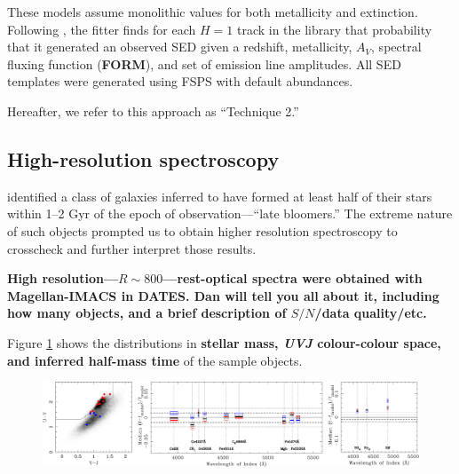 \documentclass[a4paper,fleqn,usenatbib]{mnras}
\newcommand{\bfr}{\bf\color{red}}
\newcommand{\tobs}{t_{\rm obs}}
\begin{document}
These models assume monolithic values for both metallicity and extinction. Following 
\citealt{Pacifici12}, the fitter finds for each $H=1$ track in the library that probability that it generated
an observed SED given a redshift, metallicity, $A_{V}$, spectral fluxing function ({\bfr FORM}), and 
set of emission line amplitudes. All SED templates were generated using FSPS with default abundances.

Hereafter, we refer to this approach as ``Technique 2.''

\subsection{High-resolution spectroscopy}
\label{sec: hiRes}

\citet{Dressler16, Dressler18} identified a class of galaxies inferred to have formed at least half of 
their stars within 1--2 Gyr of the epoch of observation---``late bloomers.'' The extreme nature of such objects
prompted us to obtain higher resolution spectroscopy to crosscheck and further interpret those results. 

{\bfr High resolution---$R\sim800$---rest-optical spectra were obtained with Magellan-IMACS in DATES. 
Dan will tell you all about it, including how many objects, and a brief description of $S/N$/data quality/etc.}

Figure \ref{fig:sample} shows the distributions in {\bfr stellar mass, {\it UVJ} colour-colour space, 
and inferred half-mass time} of the sample objects.

\begin{figure}
	\includegraphics[width=\columnwidth]{residuals}
	\caption{}
	\label{fig:sample}
\end{figure}

\end{document}
